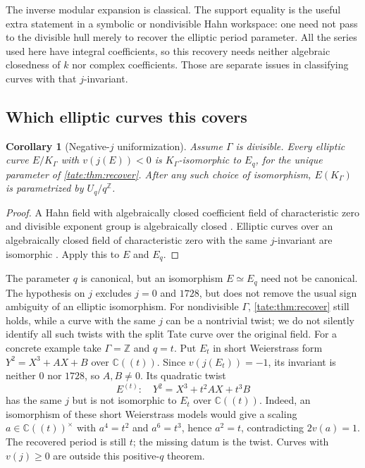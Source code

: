 \documentclass[11pt,letterpaper]{article}
\newtheorem{corollary}[corollary]{Corollary}
\theoremstyle{definition}
\newcommand{\C}{\mathbb C}
\newcommand{\Z}{\mathbb Z}
\begin{document}
The inverse modular expansion is classical. The support equality is the
useful extra statement in a symbolic or nondivisible Hahn workspace:
one need not pass to the divisible hull merely to recover the elliptic
period parameter. All the series used here have integral coefficients,
so this recovery needs neither algebraic closedness of $k$ nor complex
coefficients. Those are separate issues in classifying curves with that
$j$-invariant.

\subsection{Which elliptic curves this covers}

\begin{corollary}[Negative-$j$ uniformization]\label{tate:cor:negativej}
Assume $\Gamma$ is divisible. Every elliptic curve $E/K_\Gamma$ with
$v(j(E))<0$ is $K_\Gamma$-isomorphic to $E_q$, for the unique parameter
of \cref{tate:thm:recover}. After any such choice of isomorphism,
$E(K_\Gamma)$ is parametrized by $U_q/q^\Z$.
\end{corollary}

\begin{proof}
A Hahn field with algebraically closed coefficient field of
characteristic zero and divisible exponent group is algebraically
closed \cite[Corollary~4]{Poonen}. Elliptic curves over an algebraically closed field
of characteristic zero with the same $j$-invariant are isomorphic
\cite{SilvermanArithmetic}. Apply this to $E$ and $E_q$.
\end{proof}

The parameter $q$ is canonical, but an isomorphism $E\simeq E_q$ need
not be canonical. The hypothesis on $j$ excludes $j=0$ and $1728$, but
does not remove the usual sign ambiguity of an elliptic isomorphism.
For nondivisible $\Gamma$, \cref{tate:thm:recover} still holds, while a
curve with the same $j$ can be a nontrivial twist; we do not silently
identify all such twists with the split Tate curve over the original
field. For a concrete example take $\Gamma=\Z$ and $q=t$. Put $E_t$
in short Weierstrass form $Y^2=X^3+AX+B$ over $\C((t))$.
Since $v(j(E_t))=-1$, its invariant is neither $0$ nor $1728$, so
$A,B\ne0$. Its quadratic twist
\[
 E^{(t)}:\quad Y^2=X^3+t^2AX+t^3B
\]
has the same $j$ but is not isomorphic to $E_t$ over $\C((t))$.
Indeed, an isomorphism of these short Weierstrass models would give a
scaling $a\in\C((t))^\times$ with $a^4=t^2$ and $a^6=t^3$,
hence $a^2=t$, contradicting $2v(a)=1$. The recovered period is still
$t$; the missing datum is the twist. Curves with $v(j)\ge0$ are outside
this positive-$q$ theorem.
\end{document}
